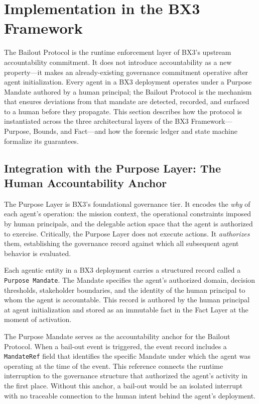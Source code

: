 \section{Implementation in the BX3 Framework}
\label{section:bailout-implementation}

The Bailout Protocol is the runtime enforcement layer of BX3's upstream accountability commitment. It does not introduce accountability as a new property—it makes an already-existing governance commitment operative after agent initialization. Every agent in a BX3 deployment operates under a Purpose Mandate authored by a human principal; the Bailout Protocol is the mechanism that ensures deviations from that mandate are detected, recorded, and surfaced to a human before they propagate. This section describes how the protocol is instantiated across the three architectural layers of the BX3 Framework—Purpose, Bounds, and Fact—and how the forensic ledger and state machine formalize its guarantees.

\subsection{Integration with the Purpose Layer: The Human Accountability Anchor}
\label{subsection:bailout-purpose-layer}

The Purpose Layer is BX3's foundational governance tier. It encodes the \emph{why} of each agent's operation: the mission context, the operational constraints imposed by human principals, and the delegable action space that the agent is authorized to exercise. Critically, the Purpose Layer does not execute actions. It \emph{authorizes} them, establishing the governance record against which all subsequent agent behavior is evaluated.

Each agentic entity in a BX3 deployment carries a structured record called a \texttt{Purpose Mandate}. The Mandate specifies the agent's authorized domain, decision thresholds, stakeholder boundaries, and the identity of the human principal to whom the agent is accountable. This record is authored by the human principal at agent initialization and stored as an immutable fact in the Fact Layer at the moment of activation.

The Purpose Mandate serves as the accountability anchor for the Bailout Protocol. When a bail-out event is triggered, the event record includes a \texttt{MandateRef} field that identifies the specific Mandate under which the agent was operating at the time of the event. This reference connects the runtime interruption to the governance structure that authorized the agent's activity in the first place. Without this anchor, a bail-out would be an isolated interrupt with no traceable connection to the human intent behind the agent's deployment.

